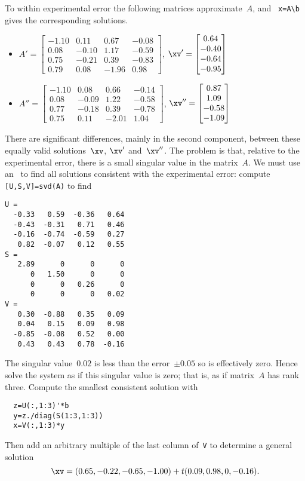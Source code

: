 \begin{example}
\begin{enumerate}
\begin{solution}
To within experimental error the following matrices approximate~\(A\), and \script\ \verb|x=A\b| gives the corresponding solutions.
\begin{itemize}\small
\item \(A'=\begin{bmatrix} -1.10&0.11&0.67&-0.08
\\0.08&-0.10&1.17&-0.59
\\0.75&-0.21&0.39&-0.83
\\0.79&0.08&-1.96&0.98 \end{bmatrix}\),
\(\xv'=\begin{bmatrix} 0.64
\\-0.40
\\-0.64
\\-0.95 \end{bmatrix}\)
\item \(A''=\begin{bmatrix} -1.10&0.08&0.66&-0.14
\\0.08&-0.09&1.22&-0.58
\\0.77&-0.18&0.39&-0.78
\\0.75&0.11&-2.01&1.04 \end{bmatrix}\),
\(\xv''=\begin{bmatrix} 0.87
\\1.09
\\-0.58
\\-1.09 \end{bmatrix}\)
\end{itemize}
There are significant differences, mainly in the second component, between these equally valid solutions~\(\xv\), \(\xv'\) and~\(\xv''\).
The problem is that, relative to the experimental error, there is a small singular value in the matrix~\(A\).
We must use an \svd\ to find all solutions consistent with the experimental error: compute \verb|[U,S,V]=svd(A)| to find~\twodp
\begin{verbatim}
U =
  -0.33   0.59  -0.36   0.64
  -0.43  -0.31   0.71   0.46
  -0.16  -0.74  -0.59   0.27
   0.82  -0.07   0.12   0.55
S =
   2.89      0      0      0
      0   1.50      0      0
      0      0   0.26      0
      0      0      0   0.02
V =
   0.30  -0.88   0.35   0.09
   0.04   0.15   0.09   0.98
  -0.85  -0.08   0.52   0.00
   0.43   0.43   0.78  -0.16
\end{verbatim}
The singular value~\(0.02\) is less than the error~\(\pm0.05\) so is effectively zero.
Hence solve the system as if this singular value is zero; that is, as if matrix~\(A\) has rank three.
Compute the smallest consistent solution with 
\begin{verbatim}
  z=U(:,1:3)'*b
  y=z./diag(S(1:3,1:3))
  x=V(:,1:3)*y
\end{verbatim}
Then add an arbitrary multiple of the last column of~\verb|V| to determine a general solution~\twodp
\begin{equation*}
\xv=(0.65,-0.22,-0.65,-1.00)+t(0.09,0.98,0,-0.16).
\end{equation*}



\end{solution}
\end{enumerate}
\end{example}
